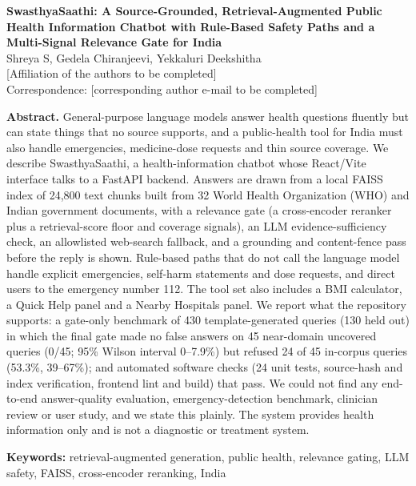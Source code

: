 \documentclass[10pt,a4paper]{article}
\begin{document}
\begin{center}
{\LARGE\bfseries SwasthyaSaathi: A Source-Grounded, Retrieval-Augmented Public Health Information Chatbot with Rule-Based Safety Paths and a Multi-Signal Relevance Gate for India}\\[1.2em]
{\large Shreya S, Gedela Chiranjeevi, Yekkaluri Deekshitha}\\[0.4em]
{\small [Affiliation of the authors to be completed]}\\
{\small Correspondence: [corresponding author e-mail to be completed]}
\end{center}

\vspace{0.6em}
\noindent\textbf{Abstract.}
General-purpose language models answer health questions fluently but can state things that no source supports, and a public-health tool for India must also handle emergencies, medicine-dose requests and thin source coverage. We describe SwasthyaSaathi, a health-information chatbot whose React/Vite interface talks to a FastAPI backend. Answers are drawn from a local FAISS index of 24,800 text chunks built from 32 World Health Organization (WHO) and Indian government documents, with a relevance gate (a cross-encoder reranker plus a retrieval-score floor and coverage signals), an LLM evidence-sufficiency check, an allowlisted web-search fallback, and a grounding and content-fence pass before the reply is shown. Rule-based paths that do not call the language model handle explicit emergencies, self-harm statements and dose requests, and direct users to the emergency number 112. The tool set also includes a BMI calculator, a Quick Help panel and a Nearby Hospitals panel. We report what the repository supports: a gate-only benchmark of 430 template-generated queries (130 held out) in which the final gate made no false answers on 45 near-domain uncovered queries (0/45; 95\% Wilson interval 0--7.9\%) but refused 24 of 45 in-corpus queries (53.3\%, 39--67\%); and automated software checks (24 unit tests, source-hash and index verification, frontend lint and build) that pass. We could not find any end-to-end answer-quality evaluation, emergency-detection benchmark, clinician review or user study, and we state this plainly. The system provides health information only and is not a diagnostic or treatment system.

\medskip
\noindent\textbf{Keywords:} retrieval-augmented generation, public health, relevance gating, LLM safety, FAISS, cross-encoder reranking, India

\end{document}

